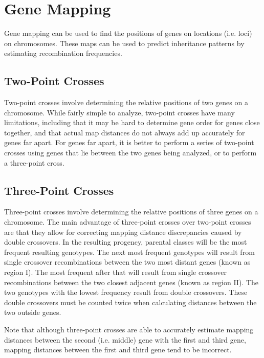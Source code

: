 \documentclass[12pt,titlepage]{article}
\begin{document}
  \newpage

  \section{Gene Mapping}
    Gene mapping can be used to find the positions of genes on locations (i.e. loci) on chromosomes. These maps can be used to predict inheritance patterns
    by estimating recombination frequencies.

    \subsection{Two-Point Crosses}
      Two-point crosses involve determining the relative positions of two genes on a chromosome. While fairly simple to analyze, two-point crosses have many
      limitations, including that it may be hard to determine gene order for genes close together, and that actual map distances do not always add up accurately
      for genes far apart. For genes far apart, it is better to perform a series of two-point crosses using genes that lie between the two genes being analyzed,
      or to perform a three-point cross.

    \subsection{Three-Point Crosses}
      Three-point crosses involve determining the relative positions of three genes on a chromosome. The main advantage of three-point crosses over two-point
      crosses are that they allow for correcting mapping distance discrepancies caused by double crossovers. In the resulting progency, parental classes
      will be the most frequent resulting genotypes. The next most frequent genotypes will result from single crossover recombinations between the two most
      distant genes (known as region I). The most frequent after that will result from single crossover recombinations between the two closest adjacent
      genes (known as region II). The two genotypes with the lowest frequency result from double crossovers. These double crossovers must be counted twice
      when calculating distances between the two outside genes.

      Note that although three-point crosses are able to accurately estimate mapping distances between the second (i.e. middle) gene with the first and third gene,
      mapping distances between the first and third gene tend to be incorrect.

  \newpage
\end{document}
